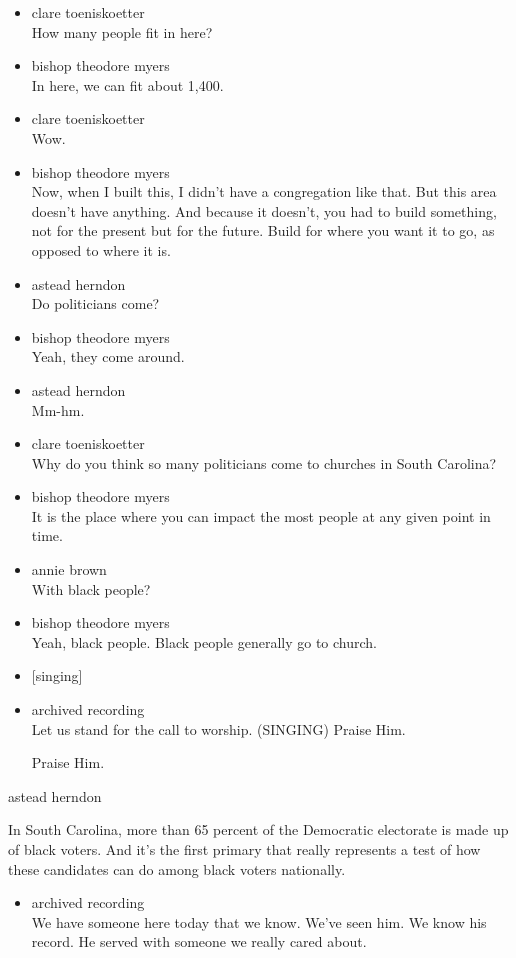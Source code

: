 \begin{itemize}
\item
  clare toeniskoetter\\
  How many people fit in here?
\item
  bishop theodore myers\\
  In here, we can fit about 1,400.
\item
  clare toeniskoetter\\
  Wow.
\item
  bishop theodore myers\\
  Now, when I built this, I didn't have a congregation like that. But
  this area doesn't have anything. And because it doesn't, you had to
  build something, not for the present but for the future. Build for
  where you want it to go, as opposed to where it is.
\item
  astead herndon\\
  Do politicians come?
\item
  bishop theodore myers\\
  Yeah, they come around.
\item
  astead herndon\\
  Mm-hm.
\item
  clare toeniskoetter\\
  Why do you think so many politicians come to churches in South
  Carolina?
\item
  bishop theodore myers\\
  It is the place where you can impact the most people at any given
  point in time.
\item
  annie brown\\
  With black people?
\item
  bishop theodore myers\\
  Yeah, black people. Black people generally go to church.
\item
  {[}singing{]}
\item
  archived recording\\
  Let us stand for the call to worship. (SINGING) Praise Him.

  Praise Him.
\end{itemize}

astead herndon

In South Carolina, more than 65 percent of the Democratic electorate is
made up of black voters. And it's the first primary that really
represents a test of how these candidates can do among black voters
nationally.

\begin{itemize}
\tightlist
\item
  archived recording\\
  We have someone here today that we know. We've seen him. We know his
  record. He served with someone we really cared about.
\end{itemize}

